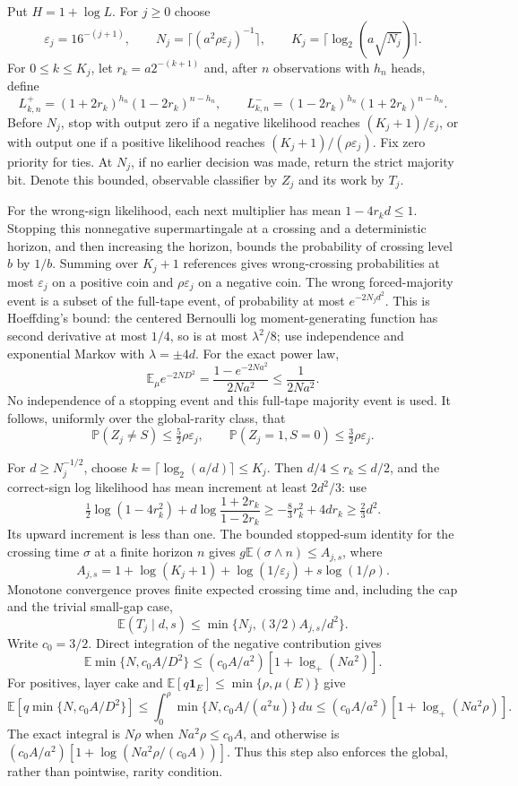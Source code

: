 \documentclass[11pt]{article}
\newcommand{\E}{\mathbb E}
\newcommand{\Pp}{\mathbb P}
\newcommand{\ind}{\mathbf1}
\begin{document}
Put $H=1+\log L$. For $j\ge0$ choose
\[
 \varepsilon_j=16^{-(j+1)},\qquad
 N_j=\lceil(a^2\rho\varepsilon_j)^{-1}\rceil,\qquad
 K_j=\lceil\log_2(a\sqrt{N_j})\rceil.
\]
For $0\le k\le K_j$, let $r_k=a2^{-(k+1)}$ and, after $n$ observations
with $h_n$ heads, define
\[
 L^+_{k,n}=(1+2r_k)^{h_n}(1-2r_k)^{n-h_n},\qquad
 L^-_{k,n}=(1-2r_k)^{h_n}(1+2r_k)^{n-h_n}.
\]
Before $N_j$, stop with output zero if a negative likelihood reaches
$(K_j+1)/\varepsilon_j$, or with output one if a positive likelihood reaches
$(K_j+1)/(\rho\varepsilon_j)$. Fix zero priority for ties. At $N_j$, if no
earlier decision was made, return the strict majority bit. Denote this bounded,
observable classifier by $Z_j$ and its work by $T_j$.

For the wrong-sign likelihood, each next multiplier has mean $1-4r_kd\le1$.
Stopping this nonnegative supermartingale at a crossing and a deterministic
horizon, and then increasing the horizon, bounds the probability of crossing
level $b$ by $1/b$. Summing over $K_j+1$ references gives wrong-crossing
probabilities at most $\varepsilon_j$ on a positive coin and
$\rho\varepsilon_j$ on a negative coin. The wrong forced-majority event is
a subset of the full-tape event, of probability at most $e^{-2N_jd^2}$.
This is Hoeffding's bound: the centered Bernoulli log moment-generating
function has second derivative at most $1/4$, so is at most $\lambda^2/8$;
use independence and exponential Markov with $\lambda=\pm4d$.
For the exact power law,
\[
 \E_\mu e^{-2ND^2}=\frac{1-e^{-2Na^2}}{2Na^2}\le\frac1{2Na^2}.
\]
No independence of a stopping event and this full-tape majority event is used.
It follows, uniformly over the global-rarity class, that
\[
 \Pp(Z_j\ne S)\le\tfrac52\rho\varepsilon_j,
 \qquad \Pp(Z_j=1,S=0)\le\tfrac32\rho\varepsilon_j.       \tag{U1}
\]

For $d\ge N_j^{-1/2}$, choose $k=\lceil\log_2(a/d)\rceil\le K_j$.
Then $d/4\le r_k\le d/2$, and the correct-sign log likelihood has mean
increment at least $2d^2/3$: use
\[
 \tfrac12\log(1-4r_k^2)
       +d\log\frac{1+2r_k}{1-2r_k}
 \ge-\tfrac83r_k^2+4dr_k\ge\tfrac23d^2.
\]
Its upward increment is less than one. The bounded stopped-sum identity for
the crossing time $\sigma$ at a finite horizon $n$ gives
$g\E(\sigma\wedge n)\le A_{j,s}$, where
\[
 A_{j,s}=1+\log(K_j+1)+\log(1/\varepsilon_j)+s\log(1/\rho).
\]
Monotone convergence proves finite expected crossing time and, including the
cap and the trivial small-gap case,
\[
 \E(T_j\mid d,s)\le\min\{N_j,(3/2)A_{j,s}/d^2\}.        \tag{U2}
\]
Write $c_0=3/2$. Direct integration of the negative contribution gives
\[
 \E\min\{N,c_0A/D^2\}
 \le(c_0A/a^2)[1+\log_+(Na^2)].
\]
For positives, layer cake and
$\E[q\ind_E]\le\min\{\rho,\mu(E)\}$ give
\[
 \E[q\min\{N,c_0A/D^2\}]
 \le\int_0^\rho\min\{N,c_0A/(a^2u)\}\,du
 \le(c_0A/a^2)[1+\log_+(Na^2\rho)].
\]
The exact integral is $N\rho$ when $Na^2\rho\le c_0A$, and otherwise is
$(c_0A/a^2)[1+\log(Na^2\rho/(c_0A))]$. Thus this step also enforces the
global, rather than pointwise, rarity condition.
\end{document}

